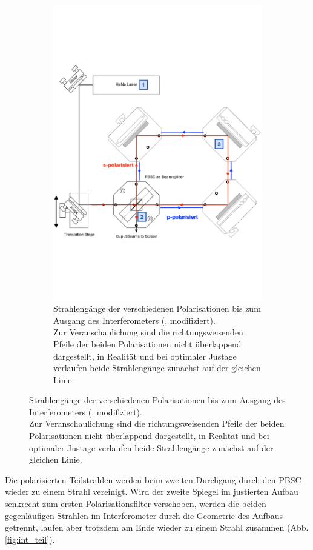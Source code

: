 \begin{figure}[!ht]
\begin{subfigure}[c]{0.50\textwidth}
    \includegraphics[width=\textwidth]{content/images/interferometer_2.pdf}
    \caption{Strahlengänge der verschiedenen Polarisationen bis zum Ausgang des Interferometers (\cite{teachspin}, modifiziert).\\
	\small{Zur Veranschaulichung sind die richtungsweisenden Pfeile der beiden Polarisationen nicht überlappend dargestellt, in Realität und bei optimaler Justage verlaufen beide Strahlengänge zunächst auf der gleichen Linie.}}
	\label{fig:int_mirr}
\end{subfigure}
\end{figure}
Die polarisierten Teilstrahlen werden beim zweiten Durchgang durch den PBSC wieder zu einem Strahl vereinigt.
Wird der zweite Spiegel im justierten Aufbau senkrecht zum ersten Polarisationsfilter verschoben, werden die beiden gegenläufigen Strahlen im Interferometer durch die Geometrie des Aufbaus getrennt, laufen aber trotzdem am Ende wieder zu einem Strahl zusammen (Abb. \ref{fig:int_teil}).
